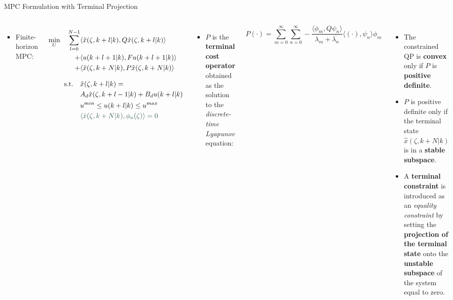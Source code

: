 \documentclass[8pt]{beamer}
\begin{document}
\begin{frame}{MPC Formulation with Terminal Projection}
\begin{columns}[t]
\begin{itemize}
    \item Finite-horizon MPC:
\end{itemize}
\begin{equation} \label{eq:MPC_finite_time}
    \begin{aligned}
        \min_{U} \quad \sum_{l=0}^{N-1} &\langle \hat{x}(\zeta, k+l | k), {Q} \hat{x}(\zeta, k+l | k) \rangle \\
        + &\langle u(k+l+1 | k), {F} u(k+l+1|k) \rangle \\
        + &\langle \hat{x}(\zeta, k+N | k), {P} \hat{x}(\zeta, k+N | k) \rangle \\[3mm]
        \text{s.t.} \quad &\hat{x}(\zeta, k+l | k) =\\
        & A_d \hat{x}(\zeta, k+l-1 | k) + B_d u(k+l | k) \\
        &u^{min} \leq u(k+l | k) \leq u^{max} \\
        & \textcolor{ualberta_darkgreen}{\langle \hat{x}(\zeta, k+N | k), {\phi_u}(\zeta) \rangle = 0}
    \end{aligned}
\end{equation}
\vspace{-2mm}
\begin{itemize}
    \item ${P}$ is the \textbf{terminal cost operator} obtained as the solution to the \textit{discrete-time Lyapunov} equation:
\end{itemize}
\begin{equation} \label{eq:terminal_cost}
    {P} (\cdot) = \sum_{m=0}^{\infty} \sum_{n=0}^{\infty} 
    -\frac{
        \langle {\phi_m} , {Q} {\psi_n} \rangle
    }{
        \lambda_m + \overline{\lambda_n}
    }
    \langle (\cdot) , {\psi_n} \rangle {\phi_m}
\end{equation}
\begin{itemize}
    \item The constrained QP is \textbf{convex} only if ${P}$ is \textbf{positive definite}.
    \item ${P}$ is {positive definite} only if the terminal state $\hat{x}(\zeta, k+N | k)$ is in a \textbf{stable subspace}.
    \item A \textcolor{ualberta_darkgreen}{\textbf{terminal constraint}} is introduced as an \textit{equality constraint} by setting the \textbf{projection of the terminal state} onto the \textbf{unstable subspace} of the system equal to zero.
\end{itemize}
\end{columns}
\end{frame}
\end{document}

